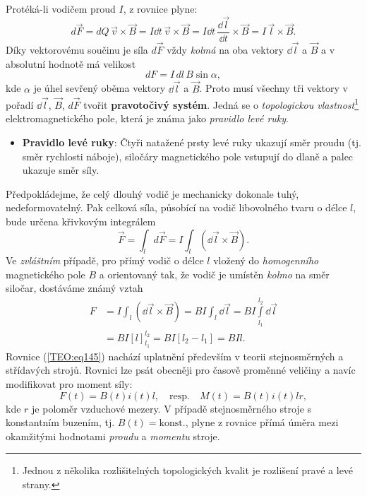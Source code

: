       Protéká-li vodičem proud \(I\), z rovnice plyne:
      \begin{equation*}
        d\vec{F} =  dQ\,\vec{v}\times\vec{B} 
                 = I\dd{t}\,\vec{v}\times\vec{B} 
                 = I\dd{t}\,\frac{\dd{\vec{l}}}{\dd{t}}\times\vec{B}
                 = I\,\vec{l}\times\vec{B}.
      \end{equation*}
      Díky vektorovému součinu je síla \(d\vec{F}\) vždy \emph{kolmá} na oba vektory
      \(\dd{\vec{l}}\) a \(\vec{B}\) a v absolutní hodnotě má velikost
      \begin{equation*}
              dF=I\,dl\,B\sin\alpha,
      \end{equation*}
      kde \(\alpha\) je úhel sevřený oběma vektory \(\dd{\vec{l}}\) a \(\vec{B}\). Proto musí všechny 
      tři vektory v pořadí \(\dd{\vec{l}}\), \(\vec{B}\), \(d\vec{F}\) tvořit \textbf{pravotočivý 
      systém}. Jedná se o \emph{topologickou vlastnost}\footnote{Jednou z několika rozlišitelných 
      topologických kvalit je rozlišení pravé a levé strany.} elektromagnetického pole, která je 
      známa jako \emph{pravidlo levé ruky}.
      \begin{itemize}
        \item \textbf{Pravidlo levé ruky}: Čtyři natažené prsty levé ruky ukazují směr proudu (tj. 
              směr rychlosti náboje), siločáry magnetického pole vstupují do dlaně a palec ukazuje 
              směr síly.
      \end{itemize}

      Předpokládejme, že celý dlouhý vodič je mechanicky dokonale tuhý, nedeformovatelný. Pak 
      celková síla, působící na vodič libovolného tvaru o délce \(l\), bude určena křivkovým 
      integrálem
      \begin{equation*}
        \vec{F} = \int_ld\vec{F} 
                = I\int_l (\dd{\vec{l}}\times\vec{B}).
      \end{equation*}
      Ve \emph{zvláštním} případě, pro přímý vodič o délce \(l\) vložený do \emph{homogenního} 
      magnetického pole \(B\) a orientovaný tak, že vodič je umístěn \emph{kolmo} na směr siločar, 
      dostáváme známý vztah
      \begin{align}\label{TEO:eq145}
        F &=  I\int_l (\dd{\vec{l}}\times\vec{B})
           = BI\int_l \dd{\vec{l}} = BI\int\limits_{l_1}^{l_2}\dd{\vec{l}}  \nonumber \\
          &= BI[l]_{l_1}^{l_2}
           = BI[l_2 - l_1]
           = BIl.
      \end{align}
      Rovnice (\ref{TEO:eq145}) nachází uplatnění především v teorii stejnosměrných a 
      střídavých strojů. Rovnici lze psát obecněji pro časově proměnné veličiny a navíc modifikovat 
      pro moment síly:
      \begin{equation*}
        F(t)=B(t)i(t)l, \quad\text{resp.} \quad M(t)=B(t)i(t)lr,
      \end{equation*}
      kde \(r\) je poloměr vzduchové mezery. V případě stejnosměrného stroje s konstantním buzením, 
      tj. \(B(t) = \text{konst.}\), plyne z rovnice přímá úměra mezi okamžitými hodnotami 
      \emph{proudu} a \emph{momentu} stroje.


